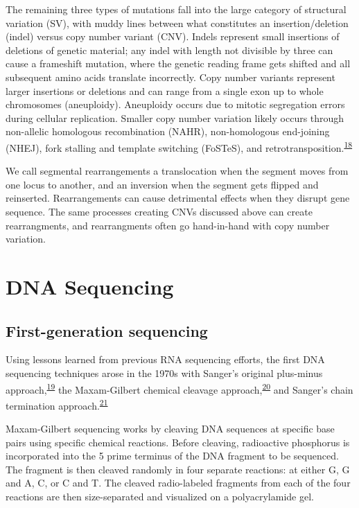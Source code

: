 \documentclass[11pt,letterpaper]{book}
\begin{document}
The remaining three types of mutations fall into the large category of structural variation (SV), with muddy lines between what constitutes an insertion/deletion (indel) versus copy number variant (CNV).
Indels represent small insertions of deletions of genetic material; any indel with length not divisible by three can cause a frameshift mutation, where the genetic reading frame gets shifted and all subsequent amino acids translate incorrectly.
Copy number variants represent larger insertions or deletions and can range from a single exon up to whole chromosomes (aneuploidy).
Aneuploidy occurs due to mitotic segregation errors during cellular replication.
Smaller copy number variation likely occurs through non-allelic homologous recombination (NAHR), non-homologous end-joining (NHEJ), fork stalling and template switching (FoSTeS), and retrotransposition.\textsuperscript{\protect\hyperlink{ref-gu:2008aa}{18}}

We call segmental rearrangements a translocation when the segment moves from one locus to another, and an inversion when the segment gets flipped and reinserted.
Rearrangements can cause detrimental effects when they disrupt gene sequence.
The same processes creating CNVs discussed above can create rearrangments, and rearrangments often go hand-in-hand with copy number variation.

\hypertarget{sequencing}{%
\section{DNA Sequencing}\label{sequencing}}

\hypertarget{firstGen}{%
\subsection{First-generation sequencing}\label{firstGen}}

Using lessons learned from previous RNA sequencing efforts, the first DNA sequencing techniques arose in the 1970s with Sanger's original plus-minus approach,\textsuperscript{\protect\hyperlink{ref-sanger:1975aa}{19}} the Maxam-Gilbert chemical cleavage approach,\textsuperscript{\protect\hyperlink{ref-maxam:1977aa}{20}} and Sanger's chain termination approach.\textsuperscript{\protect\hyperlink{ref-sanger:1977aa}{21}}

Maxam-Gilbert sequencing works by cleaving DNA sequences at specific base pairs using specific chemical reactions.
Before cleaving, radioactive phosphorus is incorporated into the 5 prime terminus of the DNA fragment to be sequenced.
The fragment is then cleaved randomly in four separate reactions: at either G, G and A, C, or C and T.
The cleaved radio-labeled fragments from each of the four reactions are then size-separated and visualized on a polyacrylamide gel.
\end{document}
